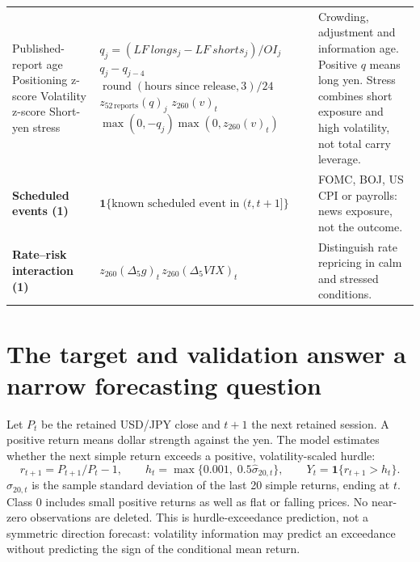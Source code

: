 \documentclass[11pt,a4paper]{article}
\begin{document}
\begin{tabular}{@{}>{\raggedright\arraybackslash}p{.225\linewidth}>{\raggedright\arraybackslash}p{.445\linewidth}>{\raggedright\arraybackslash}p{.285\linewidth}@{}}
Published-report age\newline
Positioning z-score\newline
Volatility z-score\newline
Short-yen stress
& \mbox{}\newline $q_j=(LF\ longs_j-LF\ shorts_j)/OI_j$\newline
$q_j-q_{j-4}$\newline
$\operatorname{round}(\text{hours since release},3)/24$\newline
$z_{52\,\mathrm{reports}}(q)_j$\newline
$z_{260}(v)_t$\newline
$\max(0,-q_j)\max(0,z_{260}(v)_t)$
& Crowding, adjustment and information age. Positive $q$ means long yen. Stress combines short exposure and high volatility, not total carry leverage.\\[4pt]
\textbf{Scheduled events (1)}
& $\mathbf1\{\text{known scheduled event in }(t,t+1]\}$
& FOMC, BOJ, US CPI or payrolls: news exposure, not the outcome.\\[4pt]
\textbf{Rate--risk interaction (1)}
& $z_{260}(\Delta_5g)_t\,z_{260}(\Delta_5VIX)_t$
& Distinguish rate repricing in calm and stressed conditions.\\\bottomrule
\end{tabular}
\endgroup
\vspace{4pt}

\nextpage
\section*{The target and validation answer a narrow forecasting question}
Let $P_t$ be the retained USD/JPY close and $t+1$ the next retained session. A positive return means dollar strength against the yen. The model estimates whether the next simple return exceeds a positive, volatility-scaled hurdle:
\[
r_{t+1}=P_{t+1}/P_t-1,\qquad
h_t=\max\{0.001,\;0.5\widehat\sigma_{20,t}\},\qquad
Y_t=\mathbf1\{r_{t+1}>h_t\}.
\]
$\widehat\sigma_{20,t}$ is the sample standard deviation of the last 20 simple returns, ending at $t$. Class 0 includes small positive returns as well as flat or falling prices. No near-zero observations are deleted. This is hurdle-exceedance prediction, not a symmetric direction forecast: volatility information may predict an exceedance without predicting the sign of the conditional mean return.
\end{document}
